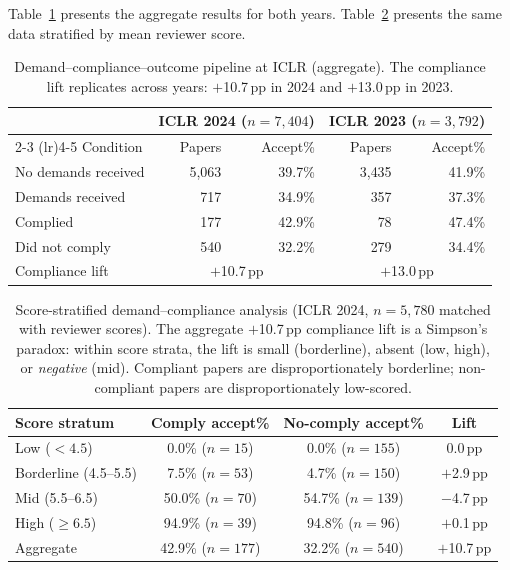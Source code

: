 \documentclass{article}
\begin{document}
Table~\ref{tab:demand_compliance} presents the aggregate results for both years. Table~\ref{tab:stratified} presents the same data stratified by mean reviewer score.

\begin{table}[t]
\centering
\caption{Demand--compliance--outcome pipeline at ICLR (aggregate). The compliance lift replicates across years: $+$10.7\,pp in 2024 and $+$13.0\,pp in 2023.}
\label{tab:demand_compliance}
\small
\begin{tabular}{@{}lrrrr@{}}
\toprule
 & \multicolumn{2}{c}{ICLR 2024 ($n = 7{,}404$)} & \multicolumn{2}{c}{ICLR 2023 ($n = 3{,}792$)} \\
\cmidrule(lr){2-3} \cmidrule(lr){4-5}
Condition & Papers & Accept\% & Papers & Accept\% \\
\midrule
No demands received & 5{,}063 & 39.7\% & 3{,}435 & 41.9\% \\
Demands received & 717 & 34.9\% & 357 & 37.3\% \\
\quad Complied & 177 & 42.9\% & 78 & 47.4\% \\
\quad Did not comply & 540 & 32.2\% & 279 & 34.4\% \\
\midrule
Compliance lift & \multicolumn{2}{c}{$+$10.7\,pp} & \multicolumn{2}{c}{$+$13.0\,pp} \\
\bottomrule
\end{tabular}
\end{table}

\begin{table}[t]
\centering
\caption{Score-stratified demand--compliance analysis (ICLR 2024, $n = 5{,}780$ matched with reviewer scores). The aggregate $+$10.7\,pp compliance lift is a Simpson's paradox: within score strata, the lift is small (borderline), absent (low, high), or \emph{negative} (mid). Compliant papers are disproportionately borderline; non-compliant papers are disproportionately low-scored.}
\label{tab:stratified}
\small
\begin{tabular}{@{}lccc@{}}
\toprule
Score stratum & Comply accept\% & No-comply accept\% & Lift \\
\midrule
Low ($< 4.5$) & 0.0\% ($n = 15$) & 0.0\% ($n = 155$) & 0.0\,pp \\
Borderline (4.5--5.5) & 7.5\% ($n = 53$) & 4.7\% ($n = 150$) & $+$2.9\,pp \\
Mid (5.5--6.5) & 50.0\% ($n = 70$) & 54.7\% ($n = 139$) & $-$4.7\,pp \\
High ($\geq 6.5$) & 94.9\% ($n = 39$) & 94.8\% ($n = 96$) & $+$0.1\,pp \\
\midrule
Aggregate & 42.9\% ($n = 177$) & 32.2\% ($n = 540$) & $+$10.7\,pp \\
\bottomrule
\end{tabular}
\end{table}
\end{document}

